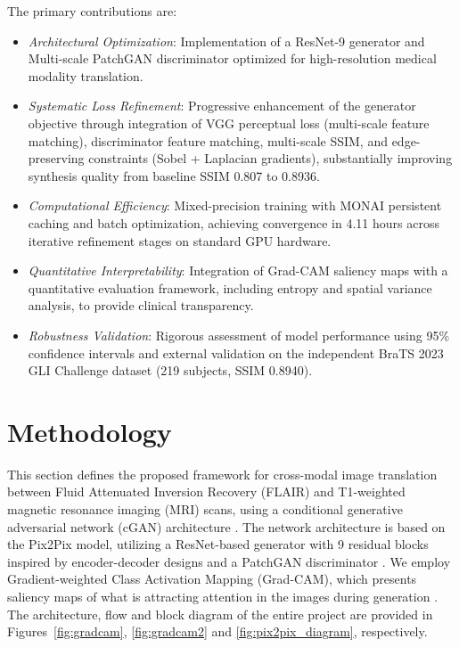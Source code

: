 \documentclass[runningheads]{llncs}
\begin{document}
The primary contributions are: \begin{itemize} \item \emph{Architectural Optimization}: Implementation of a ResNet-9 generator and Multi-scale PatchGAN discriminator optimized for high-resolution medical modality translation. \item \emph{Systematic Loss Refinement}: Progressive enhancement of the generator objective through integration of VGG perceptual loss (multi-scale feature matching), discriminator feature matching, multi-scale SSIM, and edge-preserving constraints (Sobel + Laplacian gradients), substantially improving synthesis quality from baseline SSIM 0.807 to 0.8936. \item \emph{Computational Efficiency}: Mixed-precision training with MONAI persistent caching and batch optimization, achieving convergence in 4.11 hours across iterative refinement stages on standard GPU hardware. \item \emph{Quantitative Interpretability}: Integration of Grad-CAM saliency maps with a quantitative evaluation framework, including entropy and spatial variance analysis, to provide clinical transparency. \item \emph{Robustness Validation}: Rigorous assessment of model performance using 95\% confidence intervals and external validation on the independent BraTS 2023 GLI Challenge dataset (219 subjects, SSIM 0.8940). \end{itemize}
\vspace{-0.3em}

\section{Methodology}
\vspace{-0.2em}

This section defines the proposed framework for cross-modal image translation between Fluid Attenuated Inversion Recovery (FLAIR) and T1-weighted magnetic resonance imaging (MRI) scans, using a conditional generative adversarial network (cGAN) architecture \cite{Isola2017}. The network architecture is based on the Pix2Pix model, utilizing a ResNet-based generator with 9 residual blocks inspired by encoder-decoder designs \cite{Ronneberger2015,zhu2017unpaired} and a PatchGAN discriminator \cite{Isola2017}. We employ Gradient-weighted Class Activation Mapping (Grad-CAM), which presents saliency maps of what is attracting attention in the images during generation \cite{Selvaraju2017}.
The architecture, flow and block diagram of the entire project are provided in Figures~\ref{fig:gradcam}, \ref{fig:gradcam2} and \ref{fig:pix2pix_diagram}, respectively.
\end{document}
